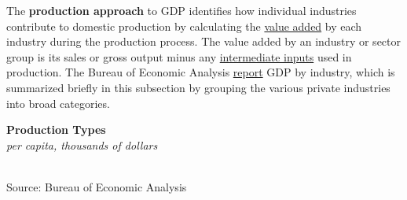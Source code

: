 \documentclass{report}
\makeatletter
\newcommand{\tbllink}[1]{\href{https://raw.githubusercontent.com/bdecon/US-chartbook/master/chartbook/data/#1}{\faTable}}
\newcommand*\short[1]{\expandafter\@gobbletwo\number\numexpr#1\relax}
\newcommand{\stdnode}[3]{\node[below, align=left, shift=({#1,#2})]{#3};}
\newcommand{\shdateaxisticks}{
		date coordinates in=x, axis line style={draw=none},
		xmax={2023-10-01},
		max space between ticks=40,	    
		xtick={{1990-01-01}, {1995-01-01}, {2000-01-01}, 
			{2005-01-01}, {2010-01-01}, {2015-01-01}, {2020-01-01}},
		minor xtick={},
		enlarge y limits={0.06}, enlarge x limits={0.01},
		}
\newcommand{\bbar}[2]{extra #1 ticks = {{#2}}, extra #1 tick labels = ,
		extra #1 tick style = {grid=major, grid style={thick, black!25}},}
\newcommand{\stdline}[4]{\addplot[very thick, no markers, color=#1] 
		table [x=#2, y=#3, col sep=comma] {#4};	}
\newcommand{\rebars}{
		\fill[color=black!10] (axis cs:{2007-12-01},\pgfkeysvalueof{/pgfplots/ymin}) rectangle 
			(axis cs:{2009-07-01}, \pgfkeysvalueof{/pgfplots/ymax});
		\fill[color=black!10] (axis cs:{2001-03-01},\pgfkeysvalueof{/pgfplots/ymin}) rectangle 
			(axis cs:{2001-11-01}, \pgfkeysvalueof{/pgfplots/ymax});
		\fill[color=black!10] (axis cs:{2020-02-01},\pgfkeysvalueof{/pgfplots/ymin}) rectangle 
			(axis cs:{2020-05-01}, \pgfkeysvalueof{/pgfplots/ymax});}
\makeatother
\begin{document}
\begin{minipage}{0.76\textwidth}
\small The \textbf{production approach} to GDP identifies how individual industries contribute to domestic production by calculating the \href{https://www.bea.gov/help/glossary/value-added}{value added} by each industry during the production process. The value added by an industry or sector group is its sales or gross output minus any \href{https://www.bea.gov/help/glossary/intermediate-inputs}{intermediate inputs} used in production. The Bureau of Economic Analysis \href{https://www.bea.gov/data/gdp/gdp-industry}{report} GDP by industry, which is summarized briefly in this subsection by grouping the various private industries into broad categories. 


\end{minipage}
\vspace{1mm}

\begin{minipage}{0.36\textwidth}
\noindent \normalsize \textbf{Production Types}\\
\footnotesize{\textit{per capita, thousands of dollars}}\\
\noindent \hspace*{-1mm} \\
\footnotesize{Source: Bureau of Economic Analysis} \hfill \tbllink{gdpva_pc.csv}\\
\end{minipage}\hspace{5mm}
\begin{minipage}{0.36\textwidth}
\small  
\end{minipage}
\vspace{1mm}
\end{document}
